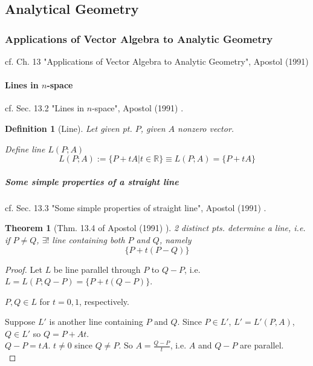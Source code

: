 \documentclass[10pt]{amsart}
\newtheorem{theorem}{Theorem}
\newtheorem{definition}{Definition}
\begin{document}
\begin{multicols*}{2}
\part{Analytical Geometry}

\section{Applications of Vector Algebra to Analytic Geometry}

cf. Ch. 13 "Applications of Vector Algebra to Analytic Geometry", Apostol (1991) \cite{Apos1991}

\subsection{Lines in $n$-space}

cf. Sec. 13.2 "Lines in $n$-space", Apostol (1991) \cite{Apos1991}.

\begin{definition}[Line]
	Let given pt. $P$, given $A$ nonzero vector. 
	
	Define line $L(P;A)$
	\begin{equation}
		L(P;A) := \lbrace P + tA | t\in \mathbb{R} \rbrace \equiv L(P;A) = \lbrace P + tA \rbrace
	\end{equation}
\end{definition}

\subsubsection{Some simple properties of a straight line}

cf. Sec. 13.3 "Some simple properties of straight line", Apostol (1991) \cite{Apos1991}.

\begin{theorem}[Thm. 13.4 of Apostol (1991) \cite{Apos1991}]
	2 distinct pts. determine a line, i.e. if $P\neq Q$, $\exists !$ line containing both $P$ and $Q$, namely
	\begin{equation}
		\lbrace P + t(P- Q) \rbrace
	\end{equation}
\end{theorem}

\begin{proof}
Let $L$ be line parallel through $P$ to $Q-P$, i.e. $L= L(P;Q-P)= \lbrace P + t(Q-P) \rbrace$.

$P,Q \in L$ for $t=0,1$, respectively.

Suppose $L'$ is another line containing $P$ and $Q$. Since $P \in L'$, $L' = L'(P,A)$, $Q \in L'$ so $Q = P + At$. \\
$Q - P = tA$. $t\neq 0$ since $Q \neq P$. So $A = \frac{Q- P}{t}$, i.e. $A$ and $Q-P$ are parallel. \\


\end{proof}
\end{multicols*}
\end{document}
